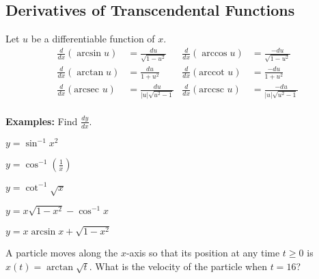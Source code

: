 \documentclass[addpoints, 12pt]{exam}
\begin{document}
\subsection*{Derivatives of Transcendental Functions}
\begin{tcolorbox}[title= DERIVATIVES OF INVERSE TRIGONOMETRIC FUNCTIONS,colframe=black,sharp corners, colback=white, colbacktitle=white, coltitle=black, boxrule=1pt]
    
    Let $u$ be a differentiable function of $x$.
    \begin{align*}
        \frac{d}{dx}(\arcsin u) &= \frac{du}{\sqrt{1-u^2}} & \frac{d}{dx}(\arccos u) &= \frac{-du}{\sqrt{1-u^2}}\\
        \frac{d}{dx}(\arctan u) &= \frac{du}{1+u^2} & \frac{d}{dx}(\text{arccot } u) &= \frac{-du}{1+u^2}\\
        \frac{d}{dx}(\text{arcsec } u) &= \frac{du}{|u|\sqrt{u^2-1}} & \frac{d}{dx}(\text{arccsc } u) &= \frac{-du}{|u|\sqrt{u^2-1}}\\
    \end{align*}
\end{tcolorbox}
\vspace{.15cm}
\noindent\textbf{Examples:} Find $\displaystyle\frac{dy}{dx}$.
\begin{questions}
    \question $\displaystyle y=\sin^{-1}x^2$
    
    \question $\displaystyle y=\cos^{-1}\left(\frac{1}{x}\right)$
    
    \question $\displaystyle y=\cot^{-1}\sqrt{x}$
    
    \question $\displaystyle y=x\sqrt{1-x^2}-\cos^{-1}x$
    
    \newpage
    
    \question $\displaystyle y=x\arcsin x+\sqrt{1-x^2}$
    
    \question A particle moves along the $x$-axis so that its position at any time $t\ge0$ is $x(t)=\arctan\sqrt{t}$. What is the velocity of the particle when $t=16$?
\end{questions}
\end{document}
